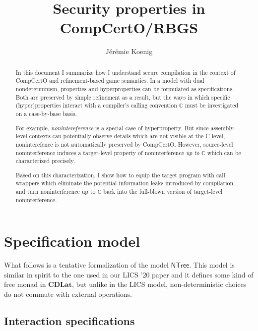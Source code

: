 \documentclass[11pt]{article}
\title{Security properties in CompCertO/RBGS}
\author{J\'er\'emie Koenig}
\begin{document}
\maketitle

\begin{abstract} %
In this document I summarize how I understand
secure compilation
in the context of CompCertO and refinement-based game semantics.
In a model with dual nondeterminism,
properties and hyperproperties
can be formulated as specifications.
Both are preserved by simple refinement as a result,
but the ways in which specific (hyper)properties interact with
a compiler's calling convention $\mathbb{C}$
must be investigated on a case-by-base basis.

For example, \emph{nonintereference} is
a special case of hyperproperty.
But since assembly-level contexts can potentially observe details
which are not visible at the C level,
noninterefence is not automatically preserved by CompCertO.
However,
source-level noninterference induces a target-level property
of noninterference \emph{up to $\mathbb{C}$}
which can be characterized precisely.

Based on this characterization,
I show how to equip the target program
with call wrappers which eliminate
the potential information leaks introduced by compilation
and turn noninterference up to $\mathbb{C}$
back into the full-blown version of target-level noninterference.
\end{abstract}

\section{Specification model} %

What follows is a tentative formalization of the model $\mathsf{NTree}$.
This model is similar in spirit to the one used in our LICS '20 paper
and it defines some kind of free monad in $\mathbf{CDLat}$,
but unlike in the LICS model,
non-deterministic choices do not commute with external operations.

\subsection{Interaction specifications} %
\end{document}
